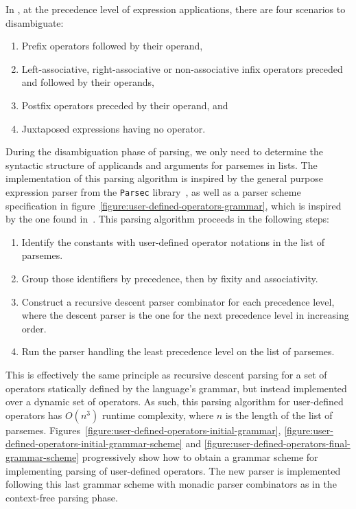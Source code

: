 In \Beluga, at the precedence level of expression applications, there are four scenarios to disambiguate:
\begin{enumerate}
\item Prefix operators followed by their operand,
\item Left-associative, right-associative or non-associative infix operators preceded and followed by their operands,
\item Postfix operators preceded by their operand, and
\item Juxtaposed expressions having no operator.
\end{enumerate}

During the disambiguation phase of parsing, we only need to determine the syntactic structure of applicands and arguments for parsemes in lists.
The implementation of this parsing algorithm is inspired by the general purpose expression parser from the \texttt{Parsec} library~\cite{leijen2001parsec}, as well as a parser scheme specification in figure~\ref{figure:user-defined-operators-grammar}, which is inspired by the one found in~\cite{danielsson2008parsing}.
This parsing algorithm proceeds in the following steps:
\begin{enumerate}
\item Identify the constants with user-defined operator notations in the list of parsemes.
\item Group those identifiers by precedence, then by fixity and associativity.
\item Construct a recursive descent parser combinator for each precedence level, where the descent parser is the one for the next precedence level in increasing order. %
\item Run the parser handling the least precedence level on the list of parsemes.
\end{enumerate}
This is effectively the same principle as recursive descent parsing for a set of operators statically defined by the language's grammar, but instead implemented over a dynamic set of operators.
As such, this parsing algorithm for user-defined operators has $ O(n^3) $ runtime complexity, where $ n $ is the length of the list of parsemes. %
Figures~\ref{figure:user-defined-operators-initial-grammar}, \ref{figure:user-defined-operators-initial-grammar-scheme} and \ref{figure:user-defined-operators-final-grammar-scheme} progressively show how to obtain a grammar scheme for implementing parsing of user-defined operators.
The new parser is implemented following this last grammar scheme with monadic parser combinators as in the context-free parsing phase.

